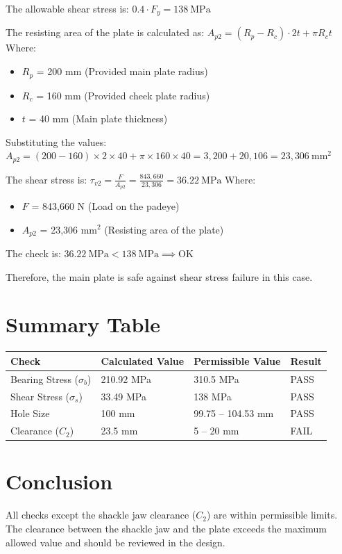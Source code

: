 \documentclass[12pt]{article}
\begin{document}
The allowable shear stress is:
\(
0.4 \cdot F_{y} = 138\ \mathrm{MPa}
\)

The resisting area of the plate is calculated as:
\(
A_{p2} = (R_p - R_c) \cdot 2t + \pi R_c t
\)
Where:
\begin{itemize}
  \item $R_p$ = 200 mm (Provided main plate radius)
  \item $R_c$ = 160 mm (Provided cheek plate radius)
  \item $t$ = 40 mm (Main plate thickness)
\end{itemize}

Substituting the values:
\(
A_{p2} = (200 - 160) \times 2 \times 40 + \pi \times 160 \times 40 = 3,200 + 20,106 = 23,306\ \mathrm{mm}^2
\)

The shear stress is:
\(
\tau_{v2} = \frac{F}{A_{p2}} = \frac{843,660}{23,306} = 36.22\ \mathrm{MPa}
\)
Where:
\begin{itemize}
  \item $F$ = 843,660 N (Load on the padeye)
  \item $A_{p2}$ = 23,306 mm$^2$ (Resisting area of the plate)
\end{itemize}

The check is:
\(
36.22\ \mathrm{MPa} < 138\ \mathrm{MPa} \implies \text{OK}
\)

Therefore, the main plate is safe against shear stress failure in this case.

\section{Summary Table}
\begin{center}
\begin{tabular}{|l|l|l|l|}
\hline
Check & Calculated Value & Permissible Value & Result \\
\hline
Bearing Stress ($\sigma_b$) & 210.92 MPa & 310.5 MPa & PASS \\
Shear Stress ($\sigma_s$) & 33.49 MPa & 138 MPa & PASS \\
Hole Size & 100 mm & 99.75 -- 104.53 mm & PASS \\
Clearance ($C_2$) & 23.5 mm & 5 -- 20 mm & FAIL \\
\hline
\end{tabular}
\end{center}

\section{Conclusion}
All checks except the shackle jaw clearance ($C_2$) are within permissible limits. The clearance between the shackle jaw and the plate exceeds the maximum allowed value and should be reviewed in the design.
\end{document}
